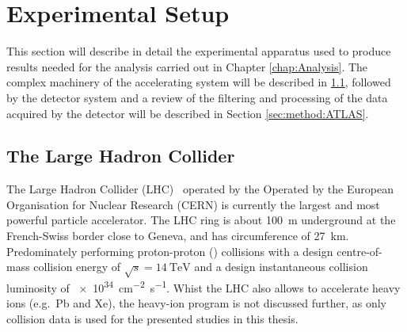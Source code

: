 \chapter{Experimental Setup}\label{chap:expSetup}
This section will describe in detail the experimental apparatus used to produce results needed for 
the analysis carried out in Chapter \cref{chap:Analysis}. The complex machinery of the accelerating 
system will be described in \cref{sec:method:LHC}, followed by the detector system and a review of 
the filtering and processing of the data acquired by the detector will be described in Section 
\ref{sec:method:ATLAS}.

\section{The Large Hadron Collider}\label{sec:method:LHC}
The Large Hadron Collider (LHC)~\cite{LHC} operated by the Operated by the European Organisation 
for Nuclear Research (CERN) is currently the largest and most powerful particle accelerator. 
The LHC ring is about \SI{100}{\metre} underground at the French-Swiss border close to Geneva, and 
has circumference of \SI{27}{\kilo\metre}. Predominately performing proton-proton (\protonproton) 
collisions with a design centre-of-mass collision energy of $\sqrt{s} = \SI{14}{\tera\electronvolt}$ 
and a design instantaneous collision luminosity of \SI{e34}{\centi\metre^{-2} \second^{-1}}.
Whist the LHC also allows to accelerate heavy ions (e.g.\ Pb and Xe), the heavy-ion program is not 
discussed further, as only \protonproton collision data is used for the presented studies in this 
thesis. 


